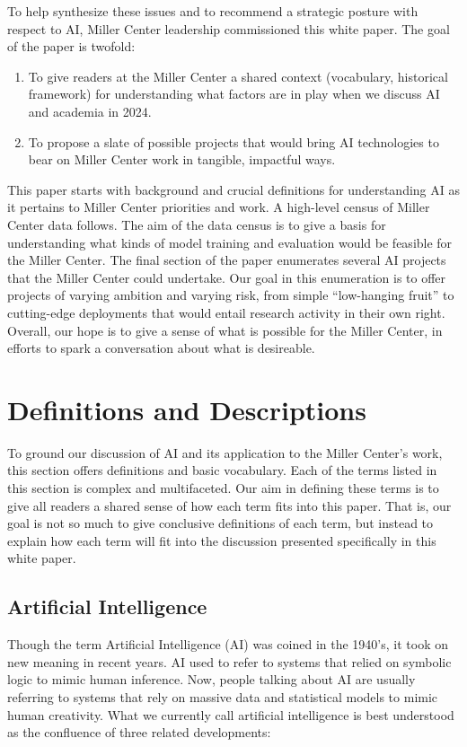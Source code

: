 \documentclass[12pt, oneside]{article}   	%
\begin{document}
To help synthesize these issues and to recommend a strategic posture with respect to AI, Miller Center leadership commissioned this white paper.  The goal of the paper is twofold:

\begin{enumerate}
\item To give readers at the Miller Center a shared context (vocabulary, historical framework) for understanding what factors are in play when we discuss AI and academia in 2024.
\item To propose a slate of possible projects that would bring AI technologies to bear on Miller Center work in tangible, impactful ways.
\end{enumerate}

This paper starts with background and crucial definitions for understanding AI as it pertains to Miller Center priorities and work.  A high-level census of Miller Center data follows.  The aim of the data census is to give a basis for understanding what kinds of model training and evaluation would be feasible for the Miller Center.  The final section of the paper enumerates several AI projects that the Miller Center could undertake.  Our goal in this enumeration is to offer projects of varying ambition and varying risk, from simple ``low-hanging fruit'' to cutting-edge deployments that would entail research activity in their own right.  Overall, our hope is to give a sense of what is possible for the Miller Center, in efforts to spark a conversation about what is desireable.


\section{Definitions and Descriptions}\label{section.definitions}
To ground our discussion of AI and its application to the Miller Center's work, this section offers definitions and basic vocabulary.  Each of the terms listed in this section is complex and multifaceted.  Our aim in defining these terms is to give all readers a shared sense of how each term fits into this paper.  That is, our goal is not so much to give conclusive definitions of each term, but instead to explain how each term will fit into the discussion presented specifically in this white paper.


\subsection{Artificial Intelligence}\label{section.definitions.artificial-intelligence}
Though the term Artificial Intelligence (AI) was coined in the 1940’s, it took on new meaning in recent years.  AI used to refer to systems that relied on symbolic logic to mimic human inference.  Now, people talking about AI are usually referring to systems that rely on massive data and statistical models to mimic human creativity.  What we currently call artificial intelligence is best understood as the confluence of three related developments:
\end{document}
